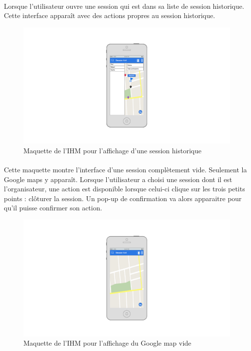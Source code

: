 \documentclass[titlepage, 12pt]{report}
\begin{document}
\clearpage

\paragraph{}Lorsque l'utilisateur ouvre une session qui est dans sa liste de session historique. Cette interface apparaît avec des actions propres au session historique.

\begin{figure}[!h]
\caption{Maquette de l'IHM pour l'affichage d'une session historique}
\label{history_session}
\centering
\includegraphics[scale=0.3]{images/mockups/history_session.png}
\end{figure}

\clearpage

\paragraph{}Cette maquette montre l'interface d'une session complètement vide. Seulement la Google maps y apparaît. Lorsque l'utilisateur a choisi une session dont il est l'organisateur, une action est disponible lorsque celui-ci clique sur les trois petits points : clôturer la session. Un pop-up de confirmation va alors apparaitre pour qu'il puisse confirmer son action.

\begin{figure}[!h]
\caption{Maquette de l'IHM pour l'affichage du Google map vide}
\label{google_map_view}
\centering
\includegraphics[scale=0.3]{images/mockups/google_map_view.png}
\end{figure}
\end{document}
